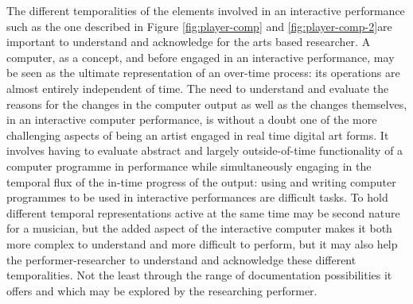 The different temporalities of the elements involved in an interactive performance such as the one described in Figure \ref{fig:player-comp}  and \ref{fig:player-comp-2}are important to understand and acknowledge for the arts based researcher. A computer, as a concept, and before  engaged in an interactive performance, may be seen as the ultimate representation of an over-time process: its operations are almost entirely independent of time. %
The need to understand and evaluate the reasons for the changes in the computer output as well as the changes themselves, in an interactive computer performance, is without a doubt one of the more challenging aspects of being an artist engaged in real time digital art forms. It involves having to evaluate abstract and largely outside-of-time functionality of a computer programme in performance while simultaneously engaging in the temporal flux of the in-time progress of the output: using and writing computer programmes to be used in interactive performances are difficult tasks. %
To hold different temporal representations active at the same time may be second nature for a musician, but the added aspect of the interactive computer makes it both more complex to understand and more difficult to perform, but it may also help the performer-researcher to understand and acknowledge these different temporalities. Not the least through the range of documentation possibilities it offers and which may be explored by the researching performer.

